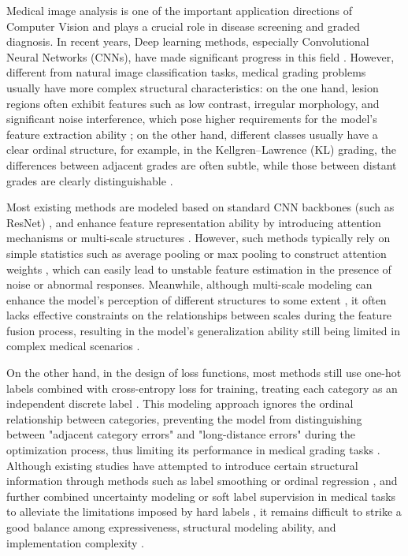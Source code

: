 \documentclass[letterpaper, 10 pt, conference]{ieeeconf}  %
\begin{document}
Medical image analysis is one of the important application directions of Computer Vision and plays a crucial role in disease screening and graded diagnosis. In recent years, Deep learning methods, especially Convolutional Neural Networks (CNNs), have made significant progress in this field \cite{1}. However, different from natural image classification tasks, medical grading problems usually have more complex structural characteristics: on the one hand, lesion regions often exhibit features such as low contrast, irregular morphology, and significant noise interference, which pose higher requirements for the model's feature extraction ability \cite{1}\cite{23}\cite{27}; on the other hand, different classes usually have a clear ordinal structure, for example, in the Kellgren–Lawrence (KL) grading, the differences between adjacent grades are often subtle, while those between distant grades are clearly distinguishable \cite{2}\cite{3}\cite{10}.

Most existing methods are modeled based on standard CNN backbones (such as ResNet) \cite{4}, and enhance feature representation ability by introducing attention mechanisms or multi-scale structures \cite{5}\cite{6}\cite{7}\cite{8}\cite{13}\cite{14}\cite{15}\cite{16}. However, such methods typically rely on simple statistics such as average pooling or max pooling to construct attention weights \cite{5}\cite{6}, which can easily lead to unstable feature estimation in the presence of noise or abnormal responses. Meanwhile, although multi-scale modeling can enhance the model's perception of different structures to some extent \cite{7}\cite{8}\cite{13}\cite{14}, it often lacks effective constraints on the relationships between scales during the feature fusion process, resulting in the model's generalization ability still being limited in complex medical scenarios \cite{8}\cite{23}.

On the other hand, in the design of loss functions, most methods still use one-hot labels combined with cross-entropy loss for training, treating each category as an independent discrete label \cite{9}\cite{10}. This modeling approach ignores the ordinal relationship between categories, preventing the model from distinguishing between "adjacent category errors" and "long-distance errors" during the optimization process, thus limiting its performance in medical grading tasks \cite{3}\cite{9}\cite{10}. Although existing studies have attempted to introduce certain structural information through methods such as label smoothing or ordinal regression \cite{9}\cite{10}\cite{11}, and further combined uncertainty modeling or soft label supervision in medical tasks to alleviate the limitations imposed by hard labels \cite{22}\cite{25}\cite{26}\cite{27}, it remains difficult to strike a good balance among expressiveness, structural modeling ability, and implementation complexity \cite{10}\cite{23}\cite{25}.
\end{document}
